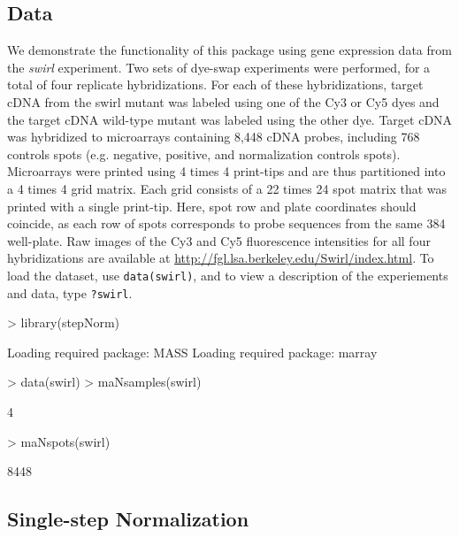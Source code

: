 \documentclass[11pt]{article}
\newcommand{\code}[1]{{\tt #1}}
\begin{document}
\subsection{Data}
We demonstrate the functionality of this package using gene expression
data from the \emph{swirl} experiment.  Two sets of dye-swap experiments 
were performed, for a total of four replicate hybridizations. For each 
of these hybridizations, target cDNA from the swirl mutant was labeled using one 
of the Cy3 or Cy5 dyes and the target cDNA wild-type mutant was labeled 
using the other dye. Target cDNA was hybridized to microarrays containing 
8,448 cDNA probes, including 768 controls spots (e.g. negative, positive, and
normalization controls spots). Microarrays were printed using 4
times 4 print-tips and are thus partitioned into a 4 times 4 grid
matrix. Each grid consists of a 22 times 24 spot matrix that was
printed with a single print-tip. Here, spot row and plate
coordinates should coincide, as each row of spots corresponds to
probe sequences from the same 384 well-plate. Raw images of the Cy3 and 
Cy5 fluorescence intensities for all four hybridizations are available at 
\url{http://fgl.lsa.berkeley.edu/Swirl/index.html}. To load the dataset, use
\code{data(swirl)}, and to view a description of the experiements
and data, type \code{?swirl}.


\begin{Schunk}
\begin{Sinput}
> library(stepNorm)
\end{Sinput}
\begin{Soutput}
Loading required package: MASS 
Loading required package: marray 
\end{Soutput}
\begin{Sinput}
> data(swirl)
> maNsamples(swirl)
\end{Sinput}
\begin{Soutput}
[1] 4
\end{Soutput}
\begin{Sinput}
> maNspots(swirl)
\end{Sinput}
\begin{Soutput}
[1] 8448
\end{Soutput}
\end{Schunk}

\subsection{Single-step Normalization}   
\end{document}
